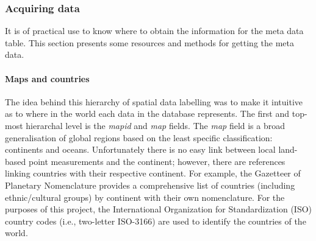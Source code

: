 \subsubsection{Acquiring data}
\label{sec:dbmtget}
It is of practical use to know where to obtain the information for the meta data table.  
This section presents some resources and methods for getting the meta data.

\paragraph{Maps and countries}
The idea behind this hierarchy of spatial data labelling was to make it intuitive as to where in the world each data in the database represents.  
The first and top-most hierarchal level is the \emph{mapid} and \emph{map} fields.  
The \emph{map} field is a broad generalisation of global regions based on the least specific classification: continents and oceans.  
Unfortunately there is no easy link between local land-based point measurements and the continent; however, there are references linking countries with their respective continent.  
For example, the Gazetteer of Planetary Nomenclature\footnotemark {} provides a comprehensive list of countries (including ethnic/cultural groups) by continent with their own nomenclature.  
For the purposes of this project, the International Organization for Standardization (ISO) country codes (i.e., two-letter ISO-3166\footnotemark {}) are used to identify the countries of the world.

